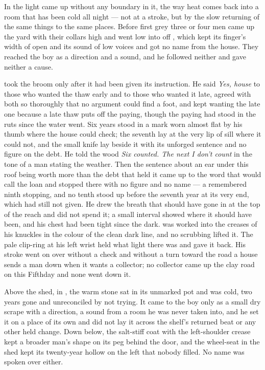 \scenebreak

In  the light came up without any boundary in it, the way heat comes back into a room that has been cold all night --- not at a stroke, but by the slow returning of the same things to the same places. Before first grey three or four men came up the yard with their collars high and went low into  off , which kept its finger's width of open and its sound of low voices and got no name from the house. They reached the boy as a direction and a sound, and he followed neither and gave neither a cause.

 took the broom only after it had been given its instruction. He said \emph{Yes, house} to those who wanted the thaw early and to those who wanted it late, agreed with both so thoroughly that no argument could find a foot, and kept wanting the late one because a late thaw puts off the paying, though the paying had stood in the ruts since the water went. Six years stood in a mark worn almost flat by his thumb where the house could check; the seventh lay at the very lip of  sill where it could not, and the small knife lay beside it with its unforged sentence and no figure on the debt. He told the wood \emph{Six counted. The next I don't count} in the tone of a man stating the weather. Then the sentence about an ear under this roof being worth more than the debt that held it came up to the word that would call the loan and stopped there with no figure and no name --- a remembered ninth stopping, and no tenth stood up before the seventh year at its very end, which had still not given. He drew the breath that should have gone in at the top of the reach and did not spend it; a small interval showed where it should have been, and his chest had been tight since the dark.  was worked into the creases of his knuckles in the colour of the clean dark line, and no scrubbing lifted it. The pale clip-ring at his left wrist held what light there was and gave it back. His stroke went on over  without a check and without a turn toward the road a house sends a man down when it wants a collector; no collector came up the clay road on this Fifthday and none went down it.

Above the shed, in , the warm stone sat in its unmarked pot and was cold, two years gone and unreconciled by not trying. It came to the boy only as a small dry scrape with a direction, a sound from a room he was never taken into, and he set it on a place of its own and did not lay it across the shelf's returned beat or any other held change. Down below, the salt-stiff coat with the left-shoulder crease kept a broader man's shape on its peg behind the door, and the wheel-seat in the shed kept its twenty-year hollow on the left that nobody filled. No name was spoken over either.

